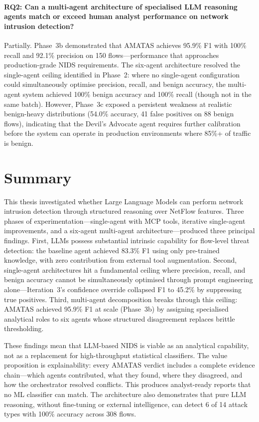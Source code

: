\documentclass[12pt, a4paper, oneside]{report}
\begin{document}
\paragraph{RQ2: Can a multi-agent architecture of specialised LLM reasoning agents
match or exceed human analyst performance on network intrusion detection?}
Partially. Phase~3b demonstrated that AMATAS achieves 95.9\% F1 with 100\% recall
and 92.1\% precision on 150 flows---performance that approaches production-grade
NIDS requirements. The six-agent architecture resolved the single-agent ceiling
identified in Phase~2: where no single-agent configuration could simultaneously
optimise precision, recall, and benign accuracy, the multi-agent system achieved
100\% benign accuracy and 100\% recall (though not in the same batch). However,
Phase~3c exposed a persistent weakness at realistic benign-heavy distributions
(54.0\% accuracy, 41 false positives on 88 benign flows), indicating that the
Devil's Advocate agent requires further calibration before the system can operate
in production environments where 85\%+ of traffic is benign.


\section{Summary}

This thesis investigated whether Large Language Models can perform network
intrusion detection through structured reasoning over NetFlow features. Three
phases of experimentation---single-agent with MCP tools, iterative single-agent
improvements, and a six-agent multi-agent architecture---produced three principal
findings. First, LLMs possess substantial intrinsic capability for flow-level
threat detection: the baseline agent achieved 83.3\% F1 using only pre-trained
knowledge, with zero contribution from external tool augmentation. Second,
single-agent architectures hit a fundamental ceiling where precision, recall, and
benign accuracy cannot be simultaneously optimised through prompt engineering
alone---Iteration~3's confidence override collapsed F1 to 45.2\% by suppressing
true positives. Third, multi-agent decomposition breaks through this ceiling:
AMATAS achieved 95.9\% F1 at scale (Phase~3b) by assigning specialised analytical
roles to six agents whose structured disagreement replaces brittle thresholding.

These findings mean that LLM-based NIDS is viable as an analytical capability,
not as a replacement for high-throughput statistical classifiers. The value
proposition is explainability: every AMATAS verdict includes a complete evidence
chain---which agents contributed, what they found, where they disagreed, and how
the orchestrator resolved conflicts. This produces analyst-ready reports that no
ML classifier can match. The architecture also demonstrates that pure LLM reasoning,
without fine-tuning or external intelligence, can detect 6 of 14 attack types with
100\% accuracy across 308 flows.
\end{document}
